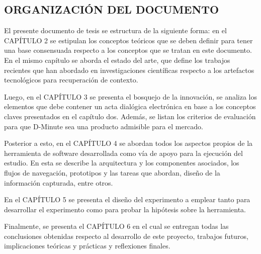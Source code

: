 \subsection{ORGANIZACIÓN DEL DOCUMENTO}

El presente documento de tesis se estructura de la siguiente forma: en el CAPÍTULO 2 se estipulan los conceptos teóricos que se deben definir para tener una base consensuada respecto a los conceptos que se tratan en este documento. En el mismo capítulo se aborda el estado del arte, que define los trabajos recientes que han abordado en investigaciones científicas respecto a los artefactos tecnológicos para recuperación de contexto.

Luego, en el CAPÍTULO 3 se presenta el bosquejo de la innovación, se analiza los elementos que debe contener un acta dialógica electrónica en base a los conceptos claves presentados en el capítulo dos. Además, se listan los criterios de evaluación para que D-Minute sea una producto admisible para el mercado.

Posterior a esto, en el CAPÍTULO 4 se abordan todos los aspectos propios de la herramienta de software desarrollada como vía de apoyo para la ejecución del estudio. En esta se describe la arquitectura y los componentes asociados, los flujos de navegación, prototipos y las tareas que abordan, diseño de la información capturada, entre otros.

En el CAPÍTULO 5 se presenta el diseño del experimento a emplear tanto para desarrollar el experimento como para probar la hipótesis sobre la herramienta. 

Finalmente, se presenta el CAPÍTULO 6 en el cual se entregan todas las conclusiones obtenidas respecto al desarrollo de este proyecto, trabajos futuros, implicaciones teóricas y prácticas y reflexiones finales.









